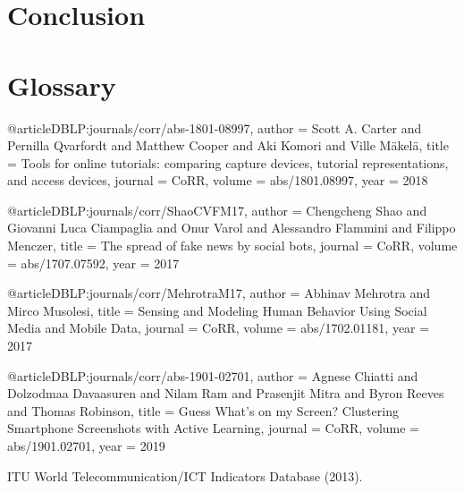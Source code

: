 \documentclass[12pt, times new roman]{article}
\begin{document}
\section{Conclusion}
\section{Glossary}
@article{DBLP:journals/corr/abs-1801-08997,
author    = {Scott A. Carter and
               Pernilla Qvarfordt and
               Matthew Cooper and
               Aki Komori and
               Ville M{\"{a}}kel{\"{a}}},
title     = {Tools for online tutorials: comparing capture devices, tutorial representations,
               and access devices},
journal   = {CoRR},
volume    = {abs/1801.08997},
year      = {2018}
}

@article{DBLP:journals/corr/ShaoCVFM17,
  author    = {Chengcheng Shao and
               Giovanni Luca Ciampaglia and
               Onur Varol and
               Alessandro Flammini and
               Filippo Menczer},
  title     = {The spread of fake news by social bots},
  journal   = {CoRR},
  volume    = {abs/1707.07592},
  year      = {2017}
}

@article{DBLP:journals/corr/MehrotraM17,
  author    = {Abhinav Mehrotra and
               Mirco Musolesi},
  title     = {Sensing and Modeling Human Behavior Using Social Media and Mobile
               Data},
  journal   = {CoRR},
  volume    = {abs/1702.01181},
  year      = {2017}
}

@article{DBLP:journals/corr/abs-1901-02701,
  author    = {Agnese Chiatti and
               Dolzodmaa Davaasuren and
               Nilam Ram and
               Prasenjit Mitra and
               Byron Reeves and
               Thomas Robinson},
  title     = {Guess What's on my Screen? Clustering Smartphone Screenshots with
               Active Learning},
  journal   = {CoRR},
  volume    = {abs/1901.02701},
  year      = {2019}
}

ITU World Telecommunication/ICT Indicators Database (2013).
\end{document}
